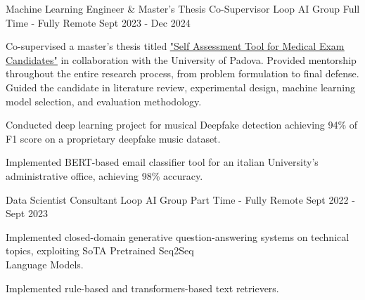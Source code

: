 \begin{cventries}
    
    \cventry
    {Machine Learning Engineer \& Master's Thesis Co-Supervisor} %
    {Loop AI Group} %
    {Full Time - Fully Remote} %
    {Sept 2023 - Dec 2024} %
    {
      \begin{cvitems} %
        \item {
        Co-supervised a master's thesis titled \href{https://thesis.unipd.it/handle/20.500.12608/70905}{\underline{"Self Assessment Tool for Medical Exam Candidates"}} in collaboration with the University of Padova.
Provided mentorship throughout the entire research process, from problem formulation to final defense.
Guided the candidate in literature review, experimental design, machine learning model selection, and evaluation methodology.
        }
        \item {Conducted deep learning project for musical Deepfake detection achieving 94\% of F1 score on a proprietary deepfake music dataset.}
        \item {Implemented BERT-based email classifier tool for an italian University's administrative office, achieving 98\% accuracy.}
      \end{cvitems}
    }

    
    \cventry
    {Data Scientist Consultant} %
    {Loop AI Group} %
    {Part Time - Fully Remote} %
    {Sept 2022 - Sept 2023} %
    {
      \begin{cvitems} %
        \item {Implemented closed-domain generative question-answering systems on technical topics, exploiting SoTA Pretrained Seq2Seq \\Language Models.}
        \item {Implemented rule-based and transformers-based text retrievers.}
      \end{cvitems}
    } 
    \begin{comment}
    \cventry
    {Bartender} %
    {Chiosco il Tempio} %
    {Part Time - Florence, Italy} %
    {June 2017 - Sept 2022} %
    {
        \begin{cvitems} %
        \item {Managed inventory and organized events, improving customer engagement and operational efficiency.}
        \item {Led team scheduling and ensured high standards of service and compliance with safety regulations.}
        \item {\textbf{Soft Skills:} Public Relations Management, Communication, Time Management, Multitasking.}
    \end{cvitems}
    }
    \end{comment}


\end{cventries}
